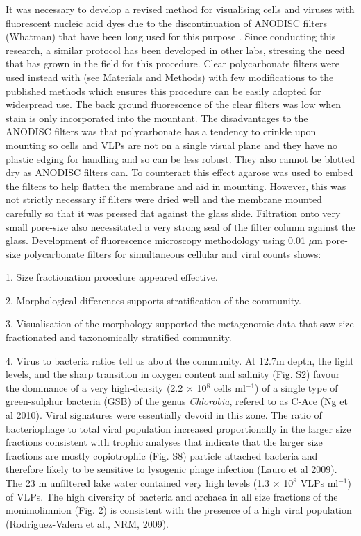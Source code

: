 It was necessary to develop a revised method for visualising cells and viruses with fluorescent nucleic acid dyes due to the discontinuation of ANODISC filters (Whatman) that have been long used for this purpose \cite{Hennes1995, Noble1998}. %
Since conducting this research, a similar protocol has been developed in other labs, stressing the need that has grown in the field for this procedure. %
Clear polycarbonate filters were used instead with (see Materials and Methods) with few modifications to the published methods which ensures this procedure can be easily adopted for widespread use.
The back ground fluorescence of the clear filters was low when stain is only incorporated into the mountant.
The disadvantages to the ANODISC filters was that polycarbonate has a tendency to crinkle upon mounting so cells and VLPs are not on a single visual plane and they have no plastic edging for handling and so can be less robust.
They also cannot be blotted dry as ANODISC filters can.
To counteract this effect agarose was used to embed the filters to help flatten the membrane and aid in mounting.
However, this was not strictly necessary if filters were dried well and the membrane mounted carefully so that it was pressed flat against the glass slide.
Filtration onto very small pore-size also necessitated a very strong seal of the filter column against the glass.
Development of fluorescence microscopy methodology using 0.01 $\mu$m pore-size polycarbonate filters for simultaneous cellular and viral counts shows:

1. Size fractionation procedure appeared effective.

2. Morphological differences supports stratification of the community.

3. Visualisation of the morphology supported the metagenomic data that saw size fractionated and taxonomically stratified community.

4. Virus to bacteria ratios tell us about the community.
At 12.7m depth, the light levels, and the sharp transition in oxygen content and salinity (Fig. S2) favour the dominance of a very high-density (2.2 $\times$ 10$^8$ cells ml$^{-1}$) of a single type of green-sulphur bacteria (GSB) of the genus \emph{Chlorobia}, refered to as C-Ace (Ng et al 2010). 
Viral signatures were essentially devoid in this zone. 
The ratio of bacteriophage to total viral population increased proportionally in the larger size fractions consistent with trophic analyses that indicate that the larger size fractions are mostly copiotrophic (Fig. S8) particle attached bacteria and therefore likely to be sensitive to lysogenic phage infection (Lauro et al 2009). 
The 23 m unfiltered lake water contained very high levels (1.3 $\times$ 10$^8$ VLPs ml$^{-1}$) of VLPs. 
The high diversity of bacteria and archaea in all size fractions of the monimolimnion (Fig. 2) is consistent with the presence of a high viral population (Rodriguez-Valera et al., NRM, 2009).

